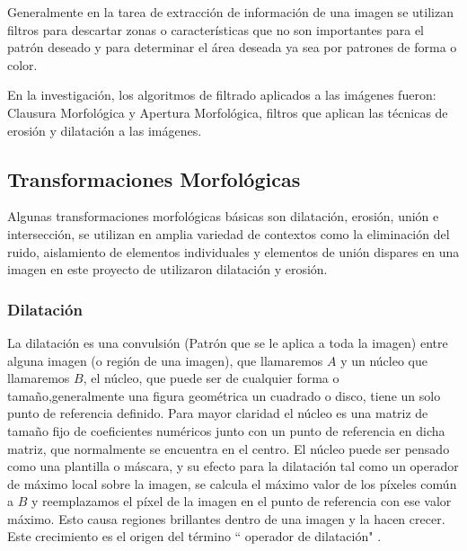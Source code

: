 Generalmente en la tarea de extracción de información de una imagen se utilizan filtros para descartar zonas o características que no son importantes para el patrón deseado y para determinar el área deseada ya sea por patrones de forma o color.

En la investigación, los algoritmos de filtrado aplicados a las imágenes fueron: Clausura Morfológica y Apertura Morfológica, filtros que aplican las técnicas de erosión y dilatación a las imágenes.

\subsection*{Transformaciones Morfológicas}\label{sec:Transfor}
Algunas transformaciones morfológicas básicas son dilatación, erosión, uni\'on e intersecci\'on, se utilizan en amplia variedad de contextos como la eliminación del ruido, aislamiento de elementos individuales y elementos de unión dispares en una imagen en este proyecto de utilizaron dilataci\'on y erosi\'on.\cite{BookOpenCv}

\subsubsection{Dilatación}
La dilatación es una convulsión (Patr\'on que se le aplica a toda la imagen) entre alguna imagen (o región de una imagen), que llamaremos $A$ y un núcleo que llamaremos $B$, el núcleo, que puede ser de cualquier forma o tamaño,generalmente una figura geom\'etrica un cuadrado o disco, tiene un solo punto de referencia definido. Para mayor claridad el n\'ucleo es una matriz de tamaño fijo de coeficientes numéricos junto con un punto de referencia en dicha matriz, que normalmente se encuentra en el centro. El núcleo puede ser pensado como una plantilla  o m\'ascara, y su efecto para la dilatación tal como un operador de máximo local sobre la imagen, se calcula el m\'aximo valor de los píxeles común a $B$ y reemplazamos el píxel de la imagen en el punto de referencia con ese valor máximo. Esto causa regiones brillantes dentro de una imagen y la hacen crecer. Este crecimiento es el origen del término `` operador de dilatación" \cite{BookOpenCv}. 

